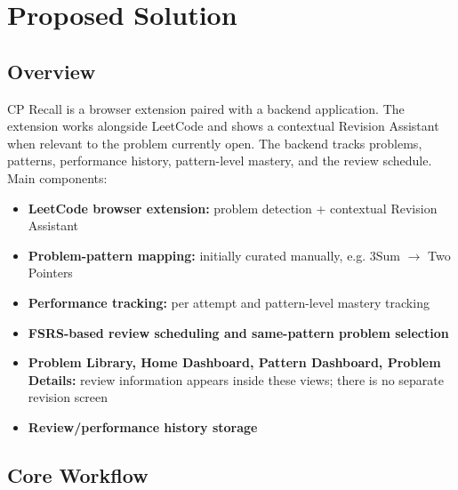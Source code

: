 \documentclass[11pt,a4paper]{article}
\begin{document}
\section{Proposed Solution}
\subsection{Overview}
CP Recall is a browser extension paired with a backend application. The extension works alongside LeetCode and shows a contextual Revision Assistant when relevant to the problem currently open. The backend tracks problems, patterns, performance history, pattern-level mastery, and the review schedule. Main components:
\begin{itemize}[leftmargin=0.7cm]
\item \textbf{LeetCode browser extension:} problem detection + contextual Revision Assistant
\item \textbf{Problem-pattern mapping:} initially curated manually, e.g. 3Sum $\rightarrow$ Two Pointers
\item \textbf{Performance tracking:} per attempt and pattern-level mastery tracking
\item \textbf{FSRS-based review scheduling and same-pattern problem selection}
\item \textbf{Problem Library, Home Dashboard, Pattern Dashboard, Problem Details:} review information appears inside these views; there is no separate revision screen
\item \textbf{Review/performance history storage}
\end{itemize}

\subsection{Core Workflow}

\begin{center}
\end{center}
\end{document}
